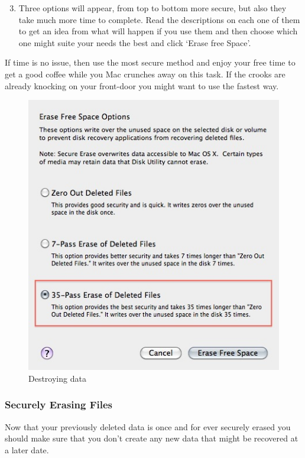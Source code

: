 \begin{enumerate}[1.]
\setcounter{enumi}{2}
\item
  Three options will appear, from top to bottom more secure, but also
  they take much more time to complete. Read the descriptions on each
  one of them to get an idea from what will happen if you use them and
  then choose which one might suite your needs the best and click `Erase
  free Space'.
\end{enumerate}
If time is no issue, then use the most secure method and enjoy your free
time to get a good coffee while you Mac crunches away on this task. If
the crooks are already knocking on your front-door you might want to use
the fastest way.

\begin{figure}[htbp]
\centering
\includegraphics{destroy_data_006.jpg}
\caption{Destroying data}
\end{figure}

\subsubsection{Securely Erasing Files}

Now that your previously deleted data is once and for ever securely
erased you should make sure that you don't create any new data that
might be recovered at a later date.

